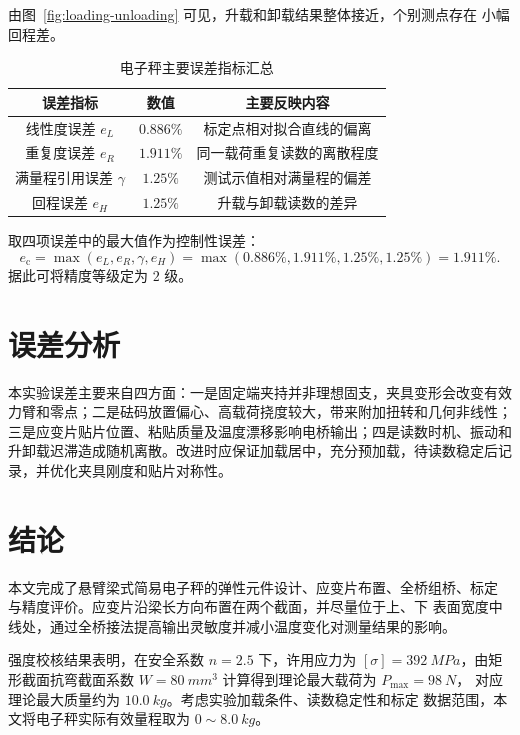 \documentclass[UTF8,a4paper,zihao=5]{ctexart}
\begin{document}
由图~\ref{fig:loading-unloading} 可见，升载和卸载结果整体接近，个别测点存在
小幅回程差。

\begin{table}[htbp]
  \centering
  \begin{tabular}{ccc}
    \toprule
    误差指标 & 数值 & 主要反映内容 \\
    \midrule
    线性度误差 \(e_L\) & \(0.886\%\) & 标定点相对拟合直线的偏离 \\
    重复度误差 \(e_R\) & \(1.911\%\) & 同一载荷重复读数的离散程度 \\
    满量程引用误差 \(\gamma\) & \(1.25\%\) & 测试示值相对满量程的偏差 \\
    回程误差 \(e_H\) & \(1.25\%\) & 升载与卸载读数的差异 \\
    \bottomrule
  \end{tabular}
  \caption{电子秤主要误差指标汇总}
  \label{tab:error-summary}
\end{table}

取四项误差中的最大值作为控制性误差：
\begin{equation}
  e_{\mathrm{c}}
  =\max(e_L,e_R,\gamma,e_H)
  =\max(0.886\%,1.911\%,1.25\%,1.25\%)
  =1.911\%.
  \label{eq:combined-error}
\end{equation}
据此可将精度等级定为 \(2\) 级。

\section{误差分析}

本实验误差主要来自四方面：一是固定端夹持并非理想固支，夹具变形会改变有效力臂和零点；二是砝码放置偏心、高载荷挠度较大，带来附加扭转和几何非线性；三是应变片贴片位置、粘贴质量及温度漂移影响电桥输出；四是读数时机、振动和升卸载迟滞造成随机离散。改进时应保证加载居中，充分预加载，待读数稳定后记录，并优化夹具刚度和贴片对称性。

\section{结论}

本文完成了悬臂梁式简易电子秤的弹性元件设计、应变片布置、全桥组桥、标定
与精度评价。应变片沿梁长方向布置在两个截面，并尽量位于上、下
表面宽度中线处，通过全桥接法提高输出灵敏度并减小温度变化对测量结果的影响。

强度校核结果表明，在安全系数 \(n=2.5\) 下，许用应力为
\([\sigma]=\SI{392}{MPa}\)，由矩形截面抗弯截面系数
\(W=\SI{80}{mm^3}\) 计算得到理论最大载荷为 \(P_{\max}=\SI{98}{N}\)，
对应理论最大质量约为 \(\SI{10.0}{kg}\)。考虑实验加载条件、读数稳定性和标定
数据范围，本文将电子秤实际有效量程取为 \(0\sim\SI{8.0}{kg}\)。
\end{document}
